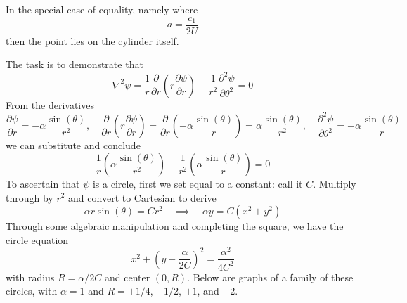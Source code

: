 \documentclass[a4paper]{article}
\begin{document}
In the special case of equality, namely where
\[
	 a = \frac{c_{1}}{2U}
\]
then the point lies on the cylinder itself. 

\vspace{12pt}


The task is to demonstrate that
\[
	\nabla^{2}\psi = \frac{1}{r}\frac{\partial }{\partial r}\!\left( r \frac{\partial \psi}{\partial r} \right) + \frac{1}{r^{2}}\frac{\partial^2 \psi}{\partial \theta^2} = 0 
\]
From the derivatives 
\[
	\frac{\partial \psi}{\partial r} = -\alpha \frac{\sin\!\left(\theta\right)}{r^{2}}, \quad \frac{\partial }{\partial r}\!\left( r \frac{\partial \psi}{\partial r} \right) = \frac{\partial }{\partial r}\!\left( -\alpha \frac{\sin\!\left(\theta\right)}{r} \right) = \alpha \frac{\sin\!\left(\theta\right)}{r^{2}}, \quad \frac{\partial^2 \psi}{\partial \theta^2} = -\alpha \frac{\sin\!\left(\theta\right)}{r} 
\]
we can substitute and conclude
\[
	\frac{1}{r}\!\left( \alpha \frac{\sin\!\left(\theta\right)}{r^{2}} \right) - \frac{1}{r^{2}}\!\left( \alpha \frac{\sin\!\left(\theta\right)}{r} \right) = 0 
\]
To ascertain that \( \psi \) is a circle, first we set equal to a constant: call it \( C \). Multiply through by \( r^{2} \) and convert to Cartesian to derive
\[
	\alpha r \sin\!\left(\theta\right) = Cr^{2} \quad \implies \quad \alpha y = C \!\left( x^{2} + y^{2} \right) 
\]
Through some algebraic manipulation and completing the square, we have the circle equation
\[
	x^{2} + \!\left( y - \frac{\alpha}{2C} \right)^{2} = \frac{\alpha^{2}}{4C^{2}} 
\]
with radius \( R = \alpha / 2C \) and center \( \!\left( 0,R \right) \). Below are graphs of a family of these circles, with \( \alpha = 1 \) and \( R = \pm 1/4 \), \( \pm 1/2 \), \( \pm 1 \), and \( \pm 2 \).

\begin{center}
\end{center}

\end{document}
